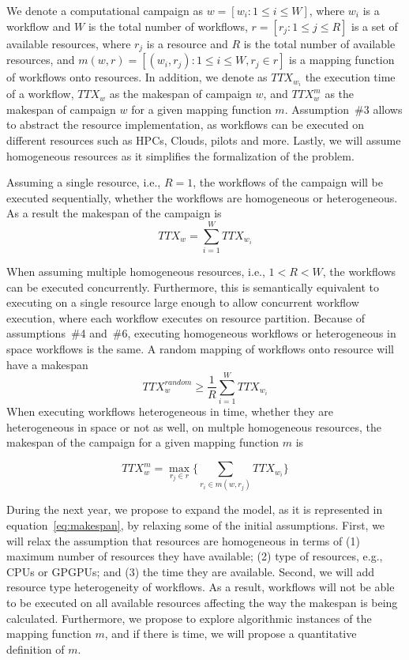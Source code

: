We denote a computational campaign as $w = [w_{i}: 1 \leq i \leq W]$, where $w_{i}$ is a workflow and $W$ is the total number of workflows, $r = [ r_{j}: 1 \leq j \leq R]$ is a set of available resources, where $r_{j}$ is a resource and $R$ is the total number of available resources, and $ m(w,r) = [(w_i, r_j): 1 \leq i \leq W, r_j \in r] $ is a mapping function of workflows onto resources.
In addition, we denote as $TTX_{w_{i}}$ the execution time of a workflow, $TTX_{w}$ as the makespan of campaign $w$, and $TTX_{w}^{m}$ as the makespan of campaign $w$ for a given mapping function $ m $.
Assumption~\#3 allows to abstract the resource implementation, as workflows can be executed on different resources such as HPCs, Clouds, pilots and more. 
Lastly, we will assume homogeneous resources as it simplifies the formalization of the problem.

Assuming a single resource, i.e., $R = 1$, the workflows of the campaign will be executed sequentially, whether the workflows are homogeneous or heterogeneous.
As a result the makespan of the campaign is
\begin{equation}
   TTX_{w} = \sum_{i=1}^{W}TTX_{w_{i}} 
\end{equation}

When assuming multiple homogeneous resources, i.e., $1 < R < W$, the workflows can be executed concurrently.
Furthermore, this is semantically equivalent to executing on a single resource large enough to allow concurrent workflow execution, where each workflow executes on resource partition. 
Because of assumptions~\#4 and~\#6, executing homogeneous workflows or heterogeneous in space workflows is the same.
A random mapping of workflows onto resource will have a makespan
\begin{equation}
   TTX_{w}^{random} \geq \frac{1}{R}\sum_{i=1}^{W} TTX_{w_{i}} 
\end{equation}
When executing workflows heterogeneous in time, whether they are heterogeneous in space or not as well, on multple homogeneous resources, the makespan of the campaign for a given mapping function $ m $ is

\begin{equation}
TTX_{w}^{m} = \max_{r_{j}\in r}\Big\{\sum_{r_{i}\in m(w,r_{j})}TTX_{w_{i}}\Big\}
\label{eq:makespan}
\end{equation}

During the next year, we propose to expand the model, as it is represented in equation~\ref{eq:makespan}, by relaxing some of the initial assumptions.
First, we will relax the assumption that resources are homogeneous in terms of (1) maximum number of resources they have available; (2) type of resources, e.g., CPUs or GPGPUs; and (3) the time they are available.
Second, we will add resource type heterogeneity of workflows.
As a result, workflows will not be able to be executed on all available resources affecting the way the makespan is being calculated.
Furthermore, we propose to explore algorithmic instances of the mapping function $ m $, and if there is time, we will propose a quantitative definition of $ m $.

